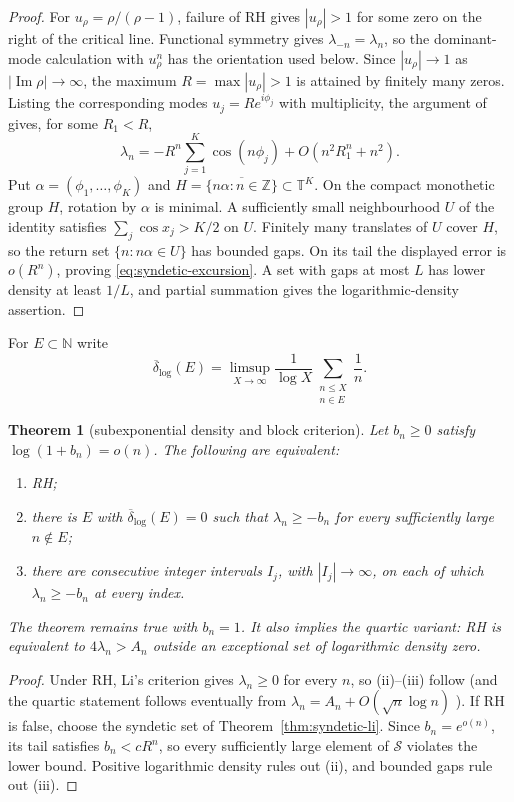 \documentclass[11pt]{amsart}
\newtheorem{theorem}{Theorem}[section]
\theoremstyle{definition}
\theoremstyle{remark}
\theoremstyle{definition}
\renewcommand{\Im}{\operatorname{Im}}
\begin{document}
\begin{proof}
For $u_\rho=\rho/(\rho-1)$, failure of RH gives $|u_\rho|>1$ for some zero on the right of the
critical line. Functional symmetry gives $\lambda_{-n}=\lambda_n$, so the dominant-mode
calculation with $u_\rho^n$ has the orientation used below. Since $|u_\rho|\to1$ as $|\Im\rho|\to\infty$, the maximum $R=\max|u_\rho|>1$ is attained by
finitely many zeros. Listing the corresponding modes $u_j=Re^{i\phi_j}$ with multiplicity, the
argument of \cite[proof of Theorem~1]{BombieriLagarias1999} gives, for some $R_1<R$,
\[
   \lambda_n=-R^n\sum_{j=1}^{K}\cos(n\phi_j)
              +O(n^2R_1^n+n^2).
\]
Put $\alpha=(\phi_1,\ldots,\phi_K)$ and
$H=\overline{\{n\alpha:n\in\mathbb Z\}}\subset\mathbb T^K$.  On the compact monothetic group
$H$, rotation by $\alpha$ is minimal.  A sufficiently small neighbourhood $U$ of the identity
satisfies $\sum_j\cos x_j>K/2$ on $U$.  Finitely many translates of $U$ cover $H$, so the return
set $\{n:n\alpha\in U\}$ has bounded gaps.  On its tail the displayed error is
$o(R^n)$, proving \eqref{eq:syndetic-excursion}.  A set with gaps at most $L$ has lower density at
least $1/L$, and partial summation gives the logarithmic-density assertion.
\end{proof}

For $E\subset\mathbb N$ write
\[
 \overline\delta_{\log}(E)=\limsup_{X\to\infty}\frac{1}{\log X}
       \sum_{\substack{n\le X\\n\in E}}\frac{1}{n}.
\]

\begin{theorem}[subexponential density and block criterion]\label{thm:density-block}
Let $b_n\ge0$ satisfy $\log(1+b_n)=o(n)$.  The following are equivalent:
\begin{enumerate}[label=\textup{(\roman*)},leftmargin=*]
\item RH;
\item there is $E$ with $\overline\delta_{\log}(E)=0$ such that
      $\lambda_n\ge-b_n$ for every sufficiently large $n\notin E$;
\item there are consecutive integer intervals $I_j$, with $|I_j|\to\infty$, on each of which
      $\lambda_n\ge-b_n$ at every index.
\end{enumerate}
The theorem remains true with $b_n=1$.  It also implies the quartic variant: RH is equivalent to
$4\lambda_n>A_n$ outside an exceptional set of logarithmic density zero.
\end{theorem}

\begin{proof}
Under RH, Li's criterion gives $\lambda_n\ge0$ for every $n$, so (ii)--(iii) follow (and the
quartic statement follows eventually from
$\lambda_n=A_n+O(\sqrt n\log n)$ \cite{Lagarias2007}).  If RH is false, choose the syndetic set of
Theorem~\ref{thm:syndetic-li}.  Since $b_n=e^{o(n)}$, its tail satisfies
$b_n<cR^n$, so every sufficiently large element of $\mathcal S$ violates the lower bound.
Positive logarithmic density rules out (ii), and bounded gaps rule out (iii).
\end{proof}
\end{document}
